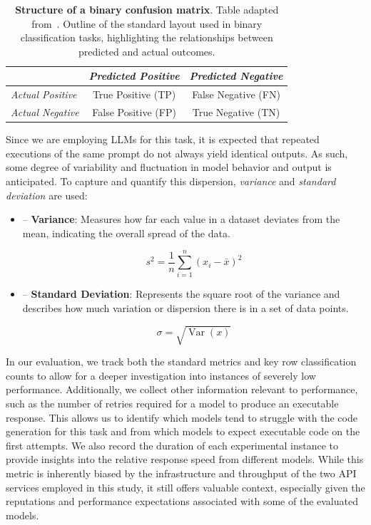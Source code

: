 \documentclass{DESSThesis}
\begin{document}
\begin{table}[h]
    \centering
    \renewcommand{\arraystretch}{1.3}
    \begin{tabular}{@{}lcc@{}}
    \toprule
     & \textit{Predicted Positive} & \textit{Predicted Negative} \\
    \midrule
    \textit{Actual Positive} & True Positive (TP) & False Negative (FN) \\
    \textit{Actual Negative} & False Positive (FP) & True Negative (TN) \\
    \bottomrule
    \end{tabular}
    \caption[Structure of a binary confusion matrix]{\textbf{Structure of a binary confusion matrix}. Table adapted from~\cite{vujovic2021classification}. Outline of the standard layout used in binary classification tasks, highlighting the relationships between predicted and actual outcomes.}
    \label{tab:confusion_matrix}
\end{table}

Since we are employing LLMs for this task, it is expected that repeated executions of the same prompt do not always yield identical outputs. As such, some degree of variability and fluctuation in model behavior and output is anticipated. To capture and quantify this dispersion, \emph{variance} and \emph{standard deviation} are used:

\begin{itemize}
    \item[] – \textbf{Variance}: Measures how far each value in a dataset deviates from the mean, indicating the overall spread of the data.

    \begin{equation}
        s^2 = \frac{1}{n} \sum_{i=1}^{n} (x_i - \bar{x})^2
    \end{equation}
    
    \item[] – \textbf{Standard Deviation}: Represents the square root of the variance and describes how much variation or dispersion there is in a set of data points.

    \begin{equation}
        \sigma = \sqrt{\operatorname{Var}(x)}
    \end{equation}
\end{itemize}

In our evaluation, we track both the standard metrics and key row classification counts to allow for a deeper investigation into instances of severely low performance. Additionally, we collect other information relevant to performance, such as the number of retries required for a model to produce an executable response. This allows us to identify which models tend to struggle with the code generation for this task and from which models to expect executable code on the first attempts. We also record the duration of each experimental instance to provide insights into the relative response speed from different models. While this metric is inherently biased by the infrastructure and throughput of the two API services employed in this study, it still offers valuable context, especially given the reputations and performance expectations associated with some of the evaluated models. 
\end{document}
